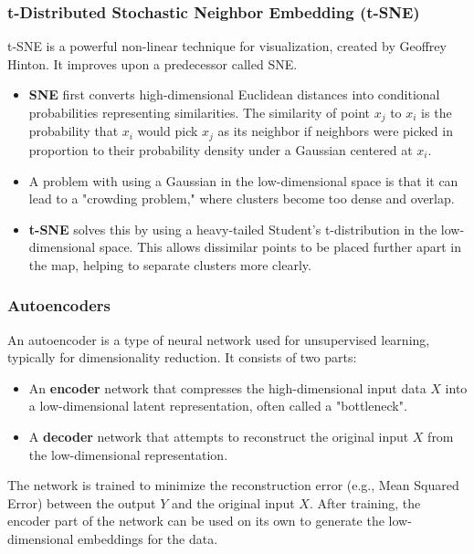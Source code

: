 \documentclass{article}
\begin{document}
\begin{multicols}{2}
	\subsubsection{t-Distributed Stochastic Neighbor Embedding (t-SNE)}
	t-SNE is a powerful non-linear technique for visualization, created by Geoffrey Hinton. It improves upon a predecessor called SNE.
	\begin{itemize}
		\item \textbf{SNE} first converts high-dimensional Euclidean distances into conditional probabilities representing similarities. The similarity of point $x_j$ to $x_i$ is the probability that $x_i$ would pick $x_j$ as its neighbor if neighbors were picked in proportion to their probability density under a Gaussian centered at $x_i$.
		\item A problem with using a Gaussian in the low-dimensional space is that it can lead to a "crowding problem," where clusters become too dense and overlap.
		\item \textbf{t-SNE} solves this by using a heavy-tailed Student's t-distribution in the low-dimensional space. This allows dissimilar points to be placed further apart in the map, helping to separate clusters more clearly.
	\end{itemize}

	\subsubsection{Autoencoders}
	An autoencoder is a type of neural network used for unsupervised learning, typically for dimensionality reduction. It consists of two parts:
	\begin{itemize}
		\item An \textbf{encoder} network that compresses the high-dimensional input data $X$ into a low-dimensional latent representation, often called a "bottleneck".
		\item A \textbf{decoder} network that attempts to reconstruct the original input $X$ from the low-dimensional representation.
	\end{itemize}
	The network is trained to minimize the reconstruction error (e.g., Mean Squared Error) between the output $Y$ and the original input $X$. After training, the encoder part of the network can be used on its own to generate the low-dimensional embeddings for the data.



\end{multicols}
\end{document}
